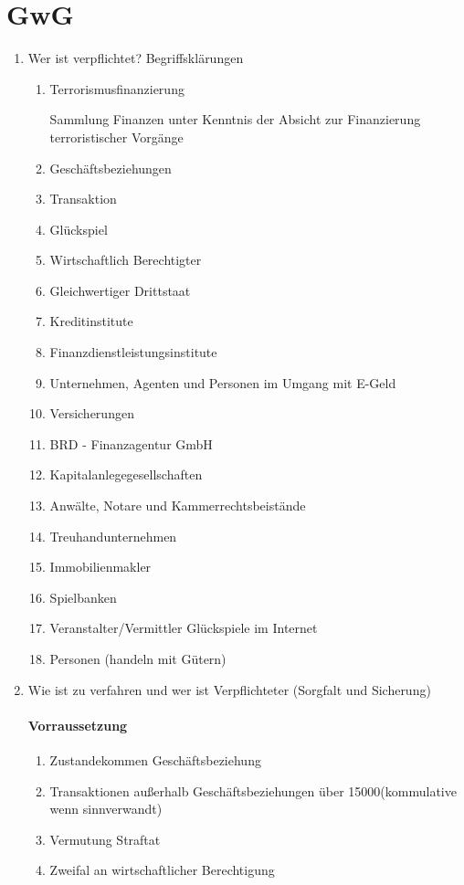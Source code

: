 \documentclass{article}
\begin{document}
\section[GwG]{GwG}
\begin{enumerate}
	\item Wer ist verpflichtet? Begriffsklärungen
		\begin{enumerate}
			\item Terrorismusfinanzierung

				Sammlung Finanzen unter Kenntnis der Absicht zur Finanzierung terroristischer Vorgänge

			\item Geschäftsbeziehungen
			\item Transaktion
			\item Glückspiel
			\item Wirtschaftlich Berechtigter
			\item Gleichwertiger Drittstaat
			\item Kreditinstitute
			\item Finanzdienstleistungsinstitute
			\item Unternehmen, Agenten und Personen im Umgang mit E-Geld
			\item Versicherungen
			\item BRD - Finanzagentur GmbH
			\item Kapitalanlegegesellschaften
			\item Anwälte, Notare und Kammerrechtsbeistände
			\item Treuhandunternehmen
			\item Immobilienmakler
			\item Spielbanken
			\item Veranstalter/Vermittler Glückspiele im Internet
			\item Personen (handeln mit Gütern)
		\end{enumerate}
	\item Wie ist zu verfahren und wer ist Verpflichteter (Sorgfalt und Sicherung)
		\paragraph{Vorraussetzung}
			\begin{enumerate}
				\item Zustandekommen Geschäftsbeziehung
				\item Transaktionen außerhalb Geschäftsbeziehungen über 15000\texteuro (kommulative wenn sinnverwandt)
				\item Vermutung Straftat
				\item Zweifal an wirtschaftlicher Berechtigung
			\end{enumerate}


\end{enumerate}
\end{document}
